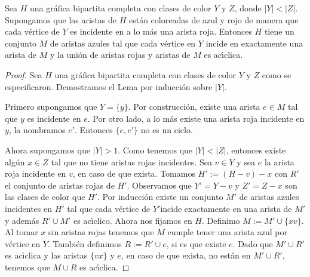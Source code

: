 \begin{lema}%
\label{lem:segundo}
    Sea $H$ una gr\'afica bipartita completa con clases de color $Y$ y $Z$,
    donde $|Y|<|Z|$. Supongamos que las aristas de $H$ est\'an coloreadas de
    azul y rojo de manera que cada v\'ertice de $Y$ es incidente en a lo m\'as
    una arista roja. Entonces $H$ tiene un conjunto $M$ de aristas azules tal
    que cada v\'ertice en $Y$ incide en exactamente una arista de $M$ y la
    uni\'on de aristas rojas y aristas de $M$ es ac\'\i{}clica.
\end{lema}

\begin{proof}
    Sea $H$ una gr\'afica bipartita completa con clases de color $Y$ y $Z$ como
    se especificaron. Demostramos el Lema por inducci\'on sobre $|Y|$. 

    Primero supongamos que $Y=\{y\}$. Por construcci\'on, existe una arista $e
    \in M$ tal que $y$ es incidente en $e$. Por otro lado, a lo m\'as existe una
    arista roja incidente en $y$, la nombramos $e'$. Entonces $\{e, e'\}$ no es
    un ciclo.

    Ahora supongamos que $|Y|>1$. Como tenemos que $|Y|<|Z|$, entonces existe
    alg\'un $x \in Z$ tal que no tiene aristas rojas incidentes. Sea $v \in Y$ y
    sea $e$ la arista roja incidente en $v$, en caso de que exista. Tomamos
    $H':= (H-v)-x$ con $R'$ el conjunto de aristas rojas de $H'$. Observamos que
    $Y' = Y- v$ y $Z'= Z- x$ son las clases de color que $H'$. Por inducci\'on
    existe un conjunto $M'$ de aristas azules incidentes en $H'$ tal que cada
    v\'ertice de $Y'$incide exactamente en una arista de $M'$ y adem\'as $R'\cup
    M'$ es ac\'\i{}clico. Ahora nos fijamos en $H$. Definimo $M:= M'\cup \{xv\}$.
    Al tomar $x$ sin aristas rojas tenemos que $M$ cumple tener una arista azul
    por v\'ertice en $Y$. Tambi\'en definimos $R:= R'\cup e$, si es que existe
    $e$.  Dado que  $M'\cup R'$ es ac\'\i{}clica y las aristas $\{vx\}$ y $e$, en caso de que exista, no
    est\'an en $M'\cup R'$, tenemos que $M \cup R$ es ac\'\i{}clica.
\end{proof}